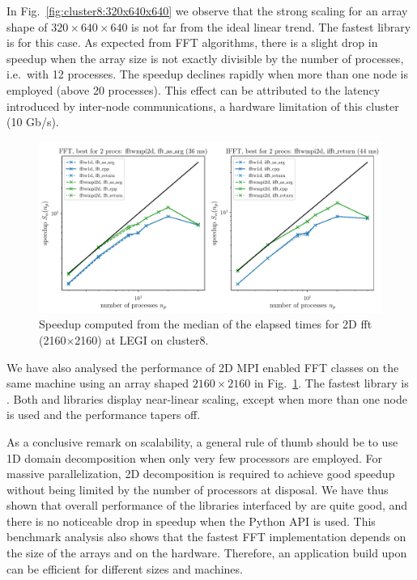 In Fig.~\ref{fig:cluster8:320x640x640} we observe that the strong scaling for an
array shape of $320\times640\times640$ is not far from the ideal linear trend. The
fastest library is  for this case.  As expected from FFT
algorithms, there is a slight drop in speedup when the array size is not exactly
divisible by the number of processes, i.e.\ with 12 processes. The speedup
declines rapidly when more than one node is employed (above 20 processes). This
effect can be attributed to the latency introduced by inter-node communications, a
hardware limitation of this cluster (10 Gb/s).

\begin{figure}[htp!]
\centering
\includegraphics[width=\linewidth]{tmp/fig_legi_cluster8_2160x2160}
\caption{Speedup computed from the median of the elapsed times for 2D fft
(2160$\times$2160) at LEGI on cluster8.}
\label{fig:cluster8:2160x2160}
\end{figure}

We have also analysed the performance of 2D MPI enabled FFT classes on the same
machine using an array shaped $2160\times2160$ in
Fig.~\ref{fig:cluster8:2160x2160}. The fastest library is
. Both  and 
libraries display near-linear scaling, except when more than one node is used
and the performance tapers off.

As a conclusive remark on scalability, a general rule of thumb should be to use
1D domain decomposition when only very few processors are employed. For massive
parallelization, 2D decomposition is required to achieve good speedup without
being limited by the number of processors at disposal. We have thus shown that
overall performance of the libraries interfaced by  are quite
good, and there is no noticeable drop in speedup when the Python API is used.
%
This benchmark analysis also shows that the fastest FFT implementation depends
on the size of the arrays and on the hardware.
%
Therefore, an application build upon  can be efficient for
different sizes and machines.


